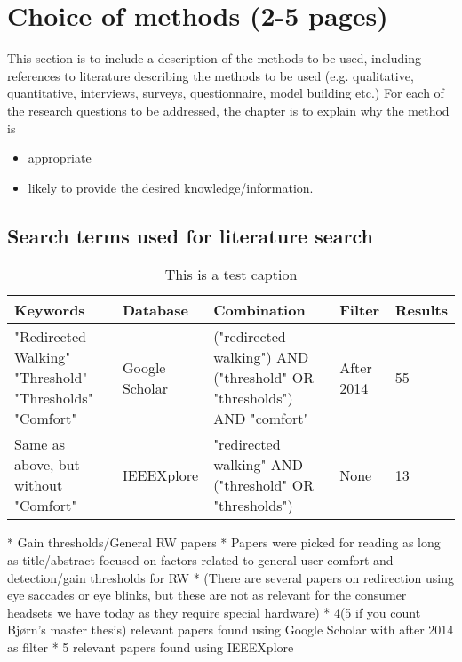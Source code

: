 \chapter{Choice of methods (2-5 pages)}
This section is to include a description of the methods to be used,
including references to literature describing the methods to be used
(e.g. qualitative, quantitative, interviews, surveys,
questionnaire,  model building etc.)
For each of the research questions to be addressed,
the chapter is to explain why the method is
\begin{itemize}
\item appropriate
\item likely to provide the desired knowledge/information.
\end{itemize}

\section{Search terms used for literature search}
\begin{table}[h!]
\centering
\begin{tabularx}{\textwidth}{|X|m{1.7cm}|X|m{1.5cm}|m{1.20cm}|} 
\hline
Keywords & Database & Combination & Filter & Results\\ 
\hline
"Redirected Walking"\newline
"Threshold"\newline
"Thresholds"\newline
"Comfort"& Google Scholar & ("redirected walking") AND ("threshold" OR "thresholds") AND "comfort" & After 2014 & 55\\ 
\hline
Same as above, but without "Comfort" & IEEEXplore & "redirected walking" AND ("threshold" OR "thresholds") & None & 13\\ 
\hline
\end{tabularx}
\caption{This is a test caption}
\label{table:literaturekeywords}
\end{table}
    
    * Gain thresholds/General RW papers
        * Papers were picked for reading as long as title/abstract focused on factors related to general user comfort and detection/gain thresholds for RW
        * (There are several papers on redirection using eye saccades or eye blinks, but these are not as relevant for the consumer headsets we have today as they require special hardware)
        * 4(5 if you count Bjørn's master thesis) relevant papers found using Google Scholar with after 2014 as filter
        * 5 relevant papers found using IEEEXplore